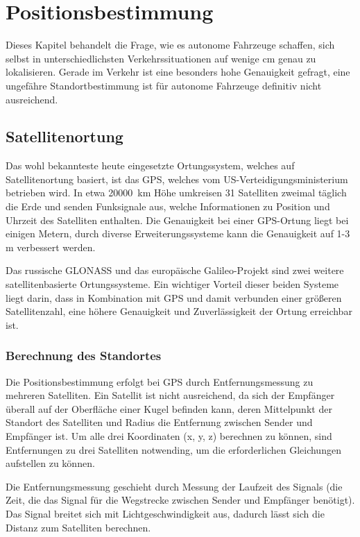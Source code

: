 \chapter{Positionsbestimmung}\label{kapitel-2}

Dieses Kapitel behandelt die Frage, wie es autonome Fahrzeuge schaffen, sich selbst in unterschiedlichsten Verkehrssituationen auf wenige \si{\centi\meter} genau zu lokalisieren. Gerade im Verkehr ist eine besonders hohe Genauigkeit gefragt, eine ungefähre Standortbestimmung ist für autonome Fahrzeuge definitiv nicht ausreichend.


\section{Satellitenortung}

Das wohl bekannteste heute eingesetzte Ortungssystem, welches auf Satellitenortung basiert, ist das \ac{GPS}, welches vom US-Verteidigungsministerium betrieben wird.  In etwa \SI{20000}{\kilo\meter} Höhe umkreisen 31 Satelliten zweimal täglich die Erde und senden Funksignale aus, welche Informationen zu Position und Uhrzeit des Satelliten enthalten. Die Genauigkeit bei einer \ac{GPS}-Ortung liegt bei einigen Metern, durch diverse Erweiterungssysteme kann die Genauigkeit auf 1-3 \si{\meter} verbessert werden.

Das russische GLONASS und das europäische Galileo-Projekt sind zwei weitere satellitenbasierte Ortungssysteme. Ein wichtiger Vorteil dieser beiden Systeme liegt darin, dass in Kombination mit \ac{GPS} und damit verbunden einer größeren Satellitenzahl, eine höhere Genauigkeit und Zuverlässigkeit der Ortung erreichbar ist.

\subsection{Berechnung des Standortes}

Die Positionsbestimmung erfolgt bei \ac{GPS} durch Entfernungsmessung zu mehreren Satelliten. Ein Satellit ist nicht ausreichend, da sich der Empfänger überall auf der Oberfläche einer Kugel befinden kann, deren Mittelpunkt der Standort des Satelliten und Radius die Entfernung zwischen Sender und Empfänger ist. Um alle drei Koordinaten (x, y, z) berechnen zu können, sind Entfernungen zu drei Satelliten notwending, um die erforderlichen Gleichungen aufstellen zu können.

Die Entfernungsmessung geschieht durch Messung der Laufzeit des Signals (\dH die Zeit, die das Signal für die Wegstrecke zwischen Sender und Empfänger benötigt). Das Signal breitet sich mit Lichtgeschwindigkeit aus, dadurch lässt sich die Distanz zum Satelliten berechnen.

